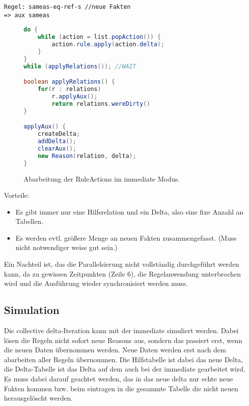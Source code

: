 \begin{verbatim}
Regel: sameas-eq-ref-s //neue Fakten
=> aux sameas
\end{verbatim}

\begin{figure}[htp]
	\caption{Abarbeitung der RuleActions im immediate Modus.}
	\label{code-immediate-delta-iteration}
	\begin{lstlisting}[language=Java]
do {
	while (action = list.popAction()) {
		action.rule.apply(action.delta);
	}
}
while (applyRelations()); //WAIT

boolean applyRelations() {
	for(r : relations)
		r.applyAux();
		return relations.wereDirty()
}

applyAux() {
	createDelta;
	addDelta();
	clearAux();
	new Reason(relation, delta);
}
	\end{lstlisting}
\end{figure}

Vorteile:
\begin{itemize}
  \item Es gibt immer nur eine Hilfsrelation und ein Delta, also eine fixe Anzahl an Tabellen.
  \item Es werden evtl. größere Menge an neuen Fakten zusammengefasst. (Muss nicht notwendiger weise gut sein.)
\end{itemize}

Ein Nachteil ist, das die Parallelsierung nicht vollständig durchgeführt werden kann, da zu gewissen Zeitpunkten (Zeile 6), die Regelanwendung unterbrochen wird und die Ausführung wieder synchronisiert werden muss.

\subsection{Simulation}

Die collective delta-Iteration kann mit der immediate simuliert werden. Dabei lösen die Regeln nicht sofort neue Reasons aus, sondern das passiert erst, wenn die neuen Daten übernommen werden. Neue Daten werden erst nach dem abarbeiten aller Regeln übernommen. Die Hilfstabelle ist dabei das neue Delta, die Delta-Tabelle ist das Delta auf dem auch bei der immediate gearbeitet wird. Es muss dabei darauf geachtet werden, das in das neue delta nur echte neue Fakten kommen bzw. beim eintragen in die gesammte Tabelle die nicht neuen herausgelöscht werden.

